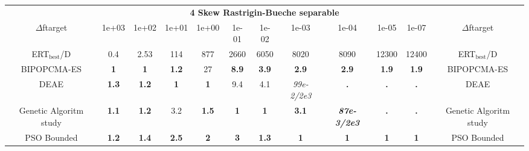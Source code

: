 \begin{tabular}{cccccccccccc}
 & \multicolumn{10}{c}{{\normalsize \textbf{4 Skew Rastrigin-Bueche separable}}}\\
$\Delta$ftarget& 1e+03& 1e+02& 1e+01& 1e+00& 1e-01& 1e-02& 1e-03& 1e-04& 1e-05& 1e-07 & $\Delta$ftarget \\
ERT$_{\textrm{best}}$/D& 0.4& 2.53& 114& 877& 2660& 6050& 8020& 8090& 12300& 12400 & ERT$_{\textrm{best}}$/D \\
\hline
BIPOPCMA-ES & \textbf{1} & \textbf{1} & \textbf{1.2} & 27 & \textbf{8.9} & \textbf{3.9} & \textbf{2.9} & \textbf{2.9} & \textbf{1.9} & \textbf{1.9} & BIPOPCMA-ES \cite{add_an_entry_for_BIPOPCMA-ES_in_bbob.bib}\\
DEAE & \textbf{1.3} & \textbf{1.2} & \textbf{1} & \textbf{1} & 9.4 & 4.1 & \textit{99e-2}\textit{/2e3} & \textbf{.} & \textbf{.} & \textbf{.} & DEAE \cite{add_an_entry_for_DEAE_in_bbob.bib}\\
Genetic Algoritm study & \textbf{1.1} & \textbf{1.2} & 3.2 & \textbf{1.5} & \textbf{1} & \textbf{1} & \textbf{3.1} & \textbf{\textit{87e-3}\textit{/2e3}} & \textbf{.} & \textbf{.} & Genetic Algoritm study \cite{add_an_entry_for_Genetic Algoritm study_in_bbob.bib}\\
PSO Bounded & \textbf{1.2} & \textbf{1.4} & \textbf{2.5} & \textbf{2} & \textbf{3} & \textbf{1.3} & \textbf{1} & \textbf{1} & \textbf{1} & \textbf{1} & PSO Bounded \cite{add_an_entry_for_PSO Bounded_in_bbob.bib}
\end{tabular}
